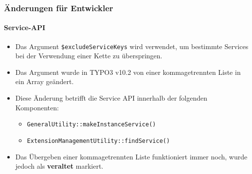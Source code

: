 \begin{frame}[fragile]
	\frametitle{Änderungen für Entwickler}
	\framesubtitle{Service-API}

	\begin{itemize}
		\item Das Argument \texttt{\$excludeServiceKeys} wird verwendet, um bestimmte Services bei der Verwendung einer Kette zu überspringen.
		\item Das Argument wurde in TYPO3 v10.2 von einer kommagetrennten Liste in ein Array geändert.
		\item Diese Änderung betrifft die Service API innerhalb der folgenden Komponenten:

			\begin{itemize}
				\item \texttt{GeneralUtility::makeInstanceService()}
				\item \texttt{ExtensionManagementUtility::findService()}
			\end{itemize}

		\item Das Übergeben einer kommagetrennten Liste funktioniert immer noch, wurde jedoch als \textbf{veraltet} markiert.

	\end{itemize}

\end{frame}

